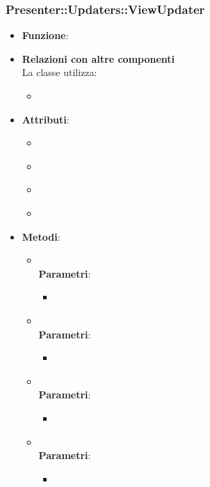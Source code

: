 \subsubsection{Presenter::Updaters::ViewUpdater}
\begin{itemize}
\item\textbf{Funzione}:
\item\textbf{Relazioni con altre componenti}\\
La classe utilizza:
	\begin{itemize}
		\item
	\end{itemize}
\item\textbf{Attributi}:
	\begin{itemize}
		\item\code{}\\
		\item\code{}\\
		\item\code{}\\
		\item\code{}\\
	\end{itemize}
\item\textbf{Metodi}:
	\begin{itemize}
		\item\code{}\\
		\textbf{Parametri}:
			\begin{itemize}
				\item\code{}\\
			\end{itemize}
		\item\code{}\\
		\textbf{Parametri}:
			\begin{itemize}
				\item\code{}\\
			\end{itemize}
		\item\code{}\\
		\textbf{Parametri}:
			\begin{itemize}
				\item\code{}\\
			\end{itemize}
		\item\code{}\\
		\textbf{Parametri}:
			\begin{itemize}
				\item\code{}\\
			\end{itemize}
	\end{itemize}
\end{itemize}


